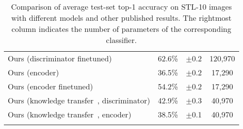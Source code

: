 \documentclass[a4paper,12pt]{report}
\begin{document}
\begin{table}[ht!]
\begin{tabular}{l c c|c}
Ours (discriminator finetuned) & 62.6\%  & $\pm$0.2 & 120,970 \\ %
Ours (encoder) & 36.5\%  & $\pm$0.2 & 17,290 \\ %
Ours (encoder finetuned) & 54.2\% & $\pm$0.2 & 17,290 \\ %
\hline
Ours (knowledge transfer~\cite{KnowledgeTransfer}, discriminator) & 42.9\% & $\pm$0.3 & 40,970 \\ %
Ours (knowledge transfer~\cite{KnowledgeTransfer}, encoder) & 38.5\% & $\pm$0.1 & 40,970 \\ %
\Xhline{0.8pt}
\end{tabular}
\caption[Comparison of average test-set top-1 accuracy on STL-10.]{Comparison of average test-set top-1 accuracy on STL-10 images with different models and other published results. The rightmost column indicates the number of parameters of the corresponding classifier.} \label{tab:comparison_stL10}
\end{table}
\end{document}
